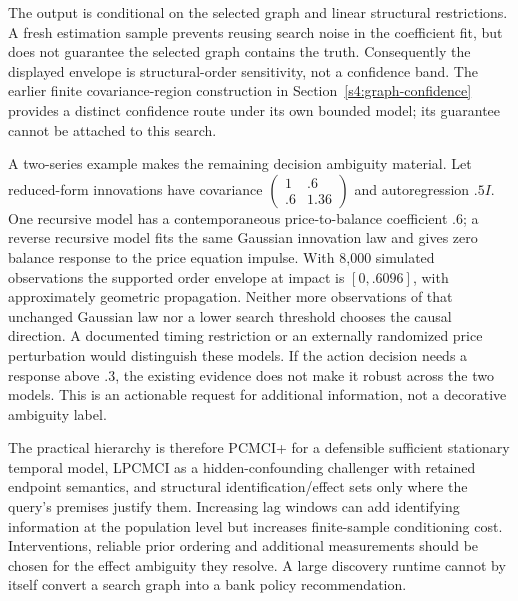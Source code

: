 The output is conditional on the selected graph and linear structural
restrictions. A fresh estimation sample prevents reusing search noise in the
coefficient fit, but does not guarantee the selected graph contains the
truth. Consequently the displayed envelope is structural-order sensitivity,
not a confidence band. The earlier finite covariance-region construction
in Section~\ref{s4:graph-confidence} provides a distinct confidence route
under its own bounded model; its guarantee cannot be attached to this search.

A two-series example makes the remaining decision ambiguity material.
Let reduced-form innovations have covariance
$\left(\begin{smallmatrix}1&.6\\.6&1.36\end{smallmatrix}\right)$ and
autoregression $.5I$. One recursive model has a contemporaneous
price-to-balance coefficient .6; a reverse recursive model fits the same
Gaussian innovation law and gives zero balance response to the price
equation impulse. With 8,000 simulated observations the supported order
envelope at impact is $[0,.6096]$, with approximately geometric propagation.
Neither more observations of that unchanged Gaussian law nor a lower search
threshold chooses the causal direction. A documented timing restriction or
an externally randomized price perturbation would distinguish these models.
If the action decision needs a response above .3, the existing evidence does
not make it robust across the two models. This is an actionable request for
additional information, not a decorative ambiguity label.

The practical hierarchy is therefore PCMCI+ for a defensible sufficient
stationary temporal model, LPCMCI as a hidden-confounding challenger with
retained endpoint semantics, and structural identification/effect sets only
where the query's premises justify them. Increasing lag windows can add
identifying information at the population level but increases finite-sample
conditioning cost. Interventions, reliable prior ordering and additional
measurements should be chosen for the effect ambiguity they resolve. A
large discovery runtime cannot by itself convert a search graph into a
bank policy recommendation.

